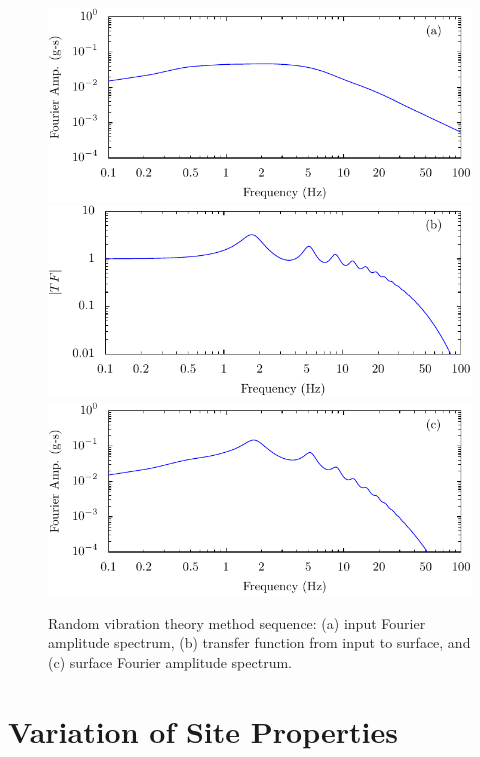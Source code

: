 \documentclass[12pt,oneside]{book}
\begin{document}
\begin{figure}[p]
    \begin{center}
        \includegraphics[width=0.95\linewidth]{figures/siteResponse/rvt-rock-fas.pdf}
        \includegraphics[width=0.95\linewidth]{figures/siteResponse/rvt-rock-surface-tf.pdf}
        \includegraphics[width=0.95\linewidth]{figures/siteResponse/rvt-surface-fas.pdf}
    \end{center}
    \caption[RVT method sequence]{Random vibration theory method sequence: (a) input
        Fourier amplitude spectrum, (b) transfer function from input to surface, and (c) surface Fourier
    amplitude spectrum.}
    \label{fig:siteResponse:rvtSequence}
\end{figure}

\chapter{Variation of Site Properties}\label{ch:var}
\end{document}
